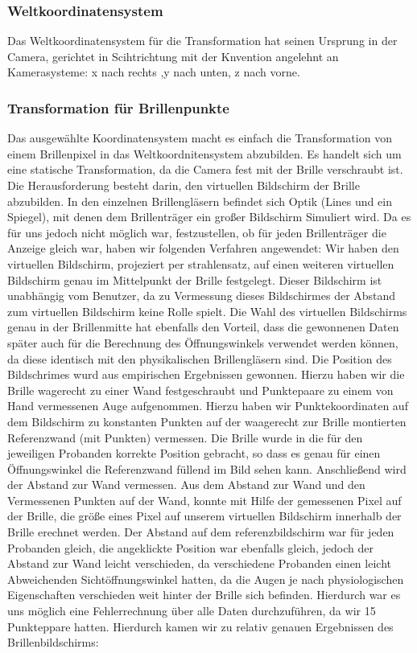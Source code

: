\subsubsection{Weltkoordinatensystem}
Das Weltkoordinatensystem für die Transformation hat seinen Ursprung in der Camera, gerichtet in Scihtrichtung mit der Knvention angelehnt an Kamerasysteme: x nach rechts  ,y nach unten, z nach vorne.
\subsubsection{Transformation für Brillenpunkte}
Das ausgewählte Koordinatensystem macht es einfach die Transformation von einem Brillenpixel in das Weltkoordnitensystem abzubilden. Es handelt sich um eine statische Transformation, da die Camera fest mit der Brille verschraubt ist. Die Herausforderung besteht darin, den virtuellen Bildschirm der Brille abzubilden. In den einzelnen Brillengläsern befindet sich Optik (Lines und ein Spiegel), mit denen dem Brillenträger ein großer Bildschirm Simuliert wird. Da es für uns jedoch nicht möglich war, festzustellen, ob für jeden Brillenträger die Anzeige gleich war, haben wir folgenden Verfahren angewendet: Wir haben den virtuellen Bildschirm, projeziert per strahlensatz, auf einen weiteren virtuellen Bildschirm genau im Mittelpunkt der Brille festgelegt. Dieser Bildschirm ist unabhängig vom Benutzer, da zu Vermessung dieses Bildschirmes der Abstand zum virtuellen Bildschirm keine Rolle spielt.
Die Wahl des virtuellen Bildschirms genau in der Brillenmitte hat ebenfalls den Vorteil, dass die gewonnenen Daten später auch für die Berechnung des Öffnungswinkels verwendet werden können, da diese identisch mit den physikalischen Brillengläsern sind.
Die Position des Bildschrimes wurd aus empirischen Ergebnissen gewonnen. Hierzu haben wir die Brille wagerecht zu einer Wand festgeschraubt und Punktepaare zu einem von Hand vermessenen Auge aufgenommen. Hierzu haben wir Punktekoordinaten auf dem Bildschirm zu konstanten Punkten auf der waagerecht zur Brille montierten Referenzwand (mit Punkten) vermessen. Die Brille wurde in die für den jeweiligen Probanden korrekte Position gebracht, so dass es genau für einen Öffnungswinkel die Referenzwand füllend im Bild sehen kann. Anschließend wird der Abstand zur Wand vermessen. Aus dem Abstand zur Wand und den Vermessenen Punkten auf der Wand, konnte mit Hilfe der gemessenen Pixel auf der Brille, die größe eines Pixel auf unserem virtuellen Bildschirm innerhalb der Brille erechnet werden. Der Abstand auf dem referenzbildschirm war für jeden Probanden gleich, die angeklickte Position war ebenfalls gleich, jedoch der Abstand zur Wand leicht verschieden, da verschiedene Probanden einen leicht Abweichenden Sichtöffnungswinkel hatten, da die Augen je nach physiologischen Eigenschaften verschieden weit hinter der Brille sich befinden. Hierdurch war es uns möglich eine Fehlerrechnung über alle Daten durchzuführen, da wir 15 Punkteppare hatten. Hierdurch kamen wir zu relativ genauen Ergebnissen des Brillenbildschirms:
    
